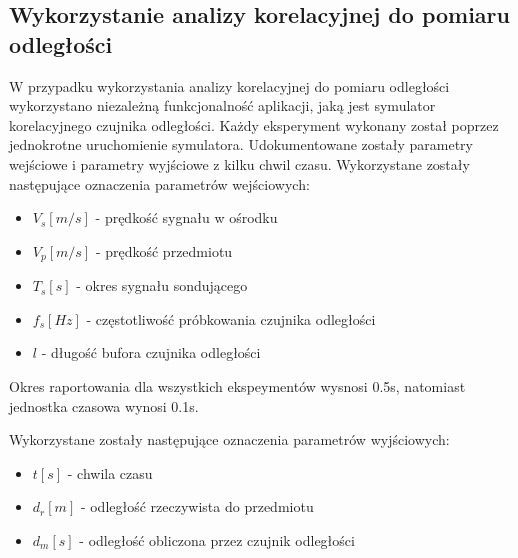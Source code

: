 \documentclass{article}
\begin{document}
        \subsection{Wykorzystanie analizy korelacyjnej do pomiaru odległości} {
            W przypadku wykorzystania analizy korelacyjnej do pomiaru odległości wykorzystano
            niezależną funkcjonalność aplikacji, jaką jest symulator korelacyjnego czujnika
            odległości. Każdy eksperyment wykonany został poprzez jednokrotne uruchomienie
            symulatora. Udokumentowane zostały parametry wejściowe i parametry wyjściowe z
            kilku chwil czasu. Wykorzystane zostały następujące oznaczenia parametrów
            wejściowych:
            \begin{itemize}
                \item $V_s[m/s]$ - prędkość sygnału w ośrodku
                \item $V_p[m/s]$ - prędkość przedmiotu
                \item $T_s[s]$ - okres sygnału sondującego
                \item $f_s[Hz]$ - częstotliwość próbkowania czujnika odległości
                \item $l$ - długość bufora czujnika odległości
            \end{itemize}
            Okres raportowania dla wszystkich ekspeymentów wysnosi 0.5s, natomiast jednostka czasowa wynosi 0.1s.

            Wykorzystane zostały następujące oznaczenia parametrów wyjściowych:
            \begin{itemize}
                \item $t[s]$ - chwila czasu
                \item $d_r[m]$ - odległość rzeczywista do przedmiotu
                \item $d_m[s]$ - odległość obliczona przez czujnik odległości
            \end{itemize}
        }
\newpage
\end{document}
